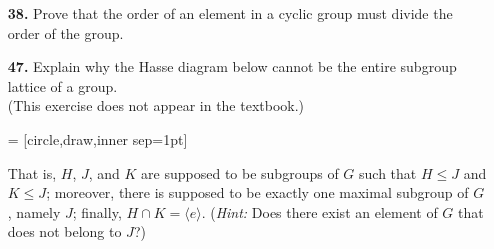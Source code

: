 \documentclass[12pt,reqno]{amsart}
\begin{document}
\medskip

\begin{enumerate}

\item[{\bf 38.}]
Prove that the order of an element in a cyclic group must divide
the order of the  group. 

\bigskip

\item[{\bf 47.}]
Explain why the Hasse diagram below cannot be the entire subgroup lattice of a group.\\
(This exercise does not appear in the textbook.)

\bigskip
\newcommand{\dotsize}{1pt}
 = [circle,draw,inner sep=\dotsize]

\newcommand{\figscale}{1.2}
\begin{center}
{  
}
\end{center}
That is, $H$, $J$, and $K$ are supposed to be subgroups of $G$ such that $H\leq J$ and $K\leq J$; 
moreover, there is supposed to be exactly one maximal subgroup of $G$, namely $J$; finally, $H \cap K = \langle e \rangle$.
({\it Hint:} Does there exist an element of $G$ that does not belong to $J$?)
\end{enumerate}
\end{document}

